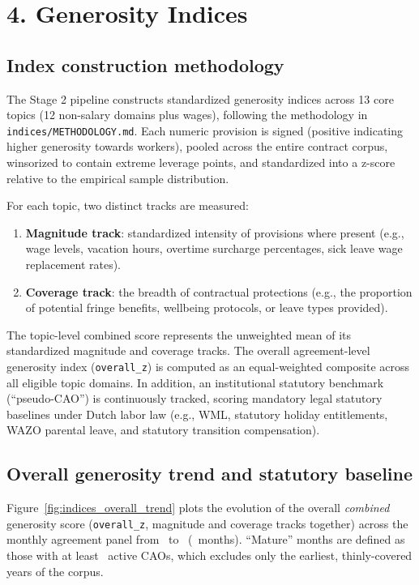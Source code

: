 \section*{4. Generosity Indices}
\label{sec:indices}

\subsection*{Index construction methodology}

The Stage 2 pipeline constructs standardized generosity indices across 13 core topics (12 non-salary domains plus wages), following the methodology in \texttt{indices/METHODOLOGY.md}. Each numeric provision is signed (positive indicating higher generosity towards workers), pooled across the entire contract corpus, winsorized to contain extreme leverage points, and standardized into a z-score relative to the empirical sample distribution.

For each topic, two distinct tracks are measured:
\begin{enumerate}
    \item \textbf{Magnitude track}: standardized intensity of provisions where present (e.g., wage levels, vacation hours, overtime surcharge percentages, sick leave wage replacement rates).
    \item \textbf{Coverage track}: the breadth of contractual protections (e.g., the proportion of potential fringe benefits, wellbeing protocols, or leave types provided).
\end{enumerate}
The topic-level combined score represents the unweighted mean of its standardized magnitude and coverage tracks. The overall agreement-level generosity index (\texttt{overall\_z}) is computed as an equal-weighted composite across all eligible topic domains. In addition, an institutional statutory benchmark (``pseudo-CAO'') is continuously tracked, scoring mandatory legal statutory baselines under Dutch labor law (e.g., WML, statutory holiday entitlements, WAZO parental leave, and statutory transition compensation).

\subsection*{Overall generosity trend and statutory baseline}

Figure~\ref{fig:indices_overall_trend} plots the evolution of the overall \emph{combined} generosity score (\texttt{overall\_z}, magnitude and coverage tracks together) across the monthly agreement panel from \IndPanelStartMonth\ to \IndPanelEndMonth\ (\IndPanelTotalMonths\ months). ``Mature'' months are defined as those with at least \IndMatureMinCaos\ active CAOs, which excludes only the earliest, thinly-covered years of the corpus.

